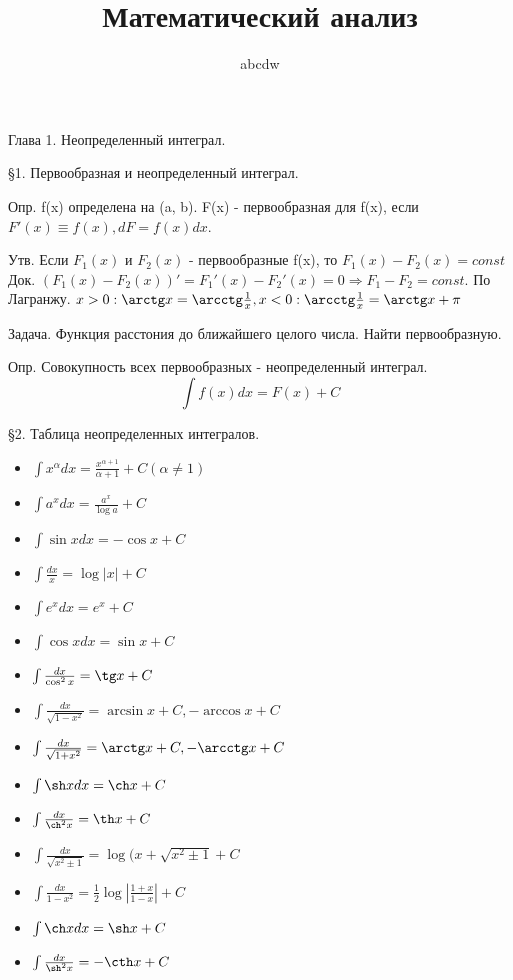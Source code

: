 \documentclass[12pt]{article}
\title{Математический анализ}
\date{}
\author{abcdw}
\begin{document}
    \maketitle
    Глава 1. Неопределенный интеграл. \newline
    
    \S1. Первообразная и неопределенный интеграл. \newline

    Опр. f(x) определена на (a, b). F(x) - первообразная для f(x), если $F'(x) \equiv f(x), dF = f(x)dx$. \newline

    Утв. Если $F_1(x)$ и $F_2(x)$ - первообразные f(x), то $F_1(x) - F_2(x) = const$ \newline
    Док. $(F_1(x) - F_2(x))' = F_1'(x) - F_2'(x) = 0 \Rightarrow F_1 - F_2 = const$. По Лагранжу.\newline
    $x>0: \arctg x = \arcctg \frac1x, x<0: \arcctg \frac1x = \arctg x + \pi$ \newline

    Задача. Функция расстония до ближайшего целого числа. Найти первообразную. \newline
    
    Опр. Совокупность всех первообразных - неопределенный интеграл. $$\int f(x) dx = F(x) + C$$ \newline

    \S2. Таблица неопределенных интегралов. \newline
    \begin{itemize}
        \item $\int x^\alpha dx = \frac{x^{\alpha + 1}}{\alpha + 1} + C (\alpha \not = 1)$
        \item $\int a^x dx = \frac{a^x}{\log a} + C$
        \item $\int \sin x dx = -\cos x + C$
        \item $\int \frac{dx}{x} = \log|x| + C$
        \item $\int e^x dx = e^x + C$
        \item $\int \cos x dx = \sin x + C$
        \item $\int \frac{dx}{\cos^2 x} = \tg x + C$
        \item $\int \frac{dx}{\sqrt{1 - x^2}} = \arcsin x + C, - \arccos x + C$
        \item $\int \frac{dx}{\sqrt{1 + x^2}} = \arctg x + C, - \arcctg x + C$
        \item $\int \sh x dx = \ch x + C$
        \item $\int \frac{dx}{\ch ^2 x} = \th x + C$
        \item $\int \frac{dx}{\sqrt{x^2 \pm 1}} = \log(x + \sqrt{x^2 \pm 1} + C$
        \item $\int \frac{dx}{1 - x^2} = \frac12 \log\left|\frac{1+x}{1-x}\right| + C$
        \item $\int \ch x dx = \sh x + C$
        \item $\int \frac{dx}{\sh ^2 x} = - \cth x + C$
    \end{itemize}
\end{document}
